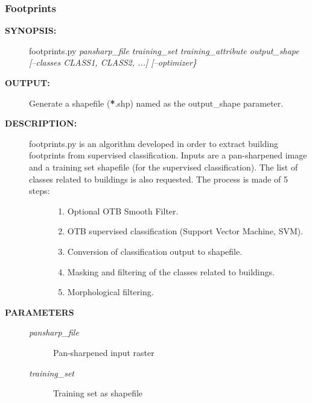 \documentclass[letterpaper,10pt,english]{sphinxmanual}
\begin{document}
\subsubsection{Footprints}
\label{user:footprints}\begin{description}
\item[{\textbf{SYNOPSIS:}}] \leavevmode
footprints.py \emph{pansharp\_file training\_set training\_attribute output\_shape {[}--classes CLASS1, CLASS2, ...{]} {[}--optimizer\}}

\item[{\textbf{OUTPUT:}}] \leavevmode
Generate a shapefile ({\color{red}\bfseries{}*}.shp) named as the output\_shape parameter.

\item[{\textbf{DESCRIPTION:}}] \leavevmode\begin{description}
\item[{footprints.py is an algorithm developed in order to extract building footprints from supervised classification. Inputs are a pan-sharpened image and a training set shapefile (for the supervised classification). The list of classes related to buildings is also requested. The process is made of 5 steps:}] \leavevmode\begin{enumerate}
\item {} 
Optional OTB Smooth Filter.

\item {} 
OTB supervised classification (Support Vector Machine, SVM).

\item {} 
Conversion of classification output to shapefile.

\item {} 
Masking and filtering of the classes related to buildings.

\item {} 
Morphological filtering.

\end{enumerate}

\end{description}

\item[{\textbf{PARAMETERS}}] \leavevmode\begin{description}
\item[{\emph{pansharp\_file}}] \leavevmode
Pan-sharpened input raster

\item[{\emph{training\_set}}] \leavevmode
Training set as shapefile


\end{description}
\end{description}
\end{document}
